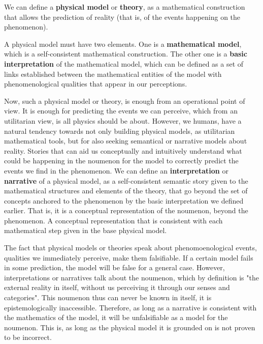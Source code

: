 \documentclass[11pt, a4paper]{article} %
\begin{document}
We can define a {\bf physical model} or {\bf theory}, as a mathematical construction that allows the prediction of reality (that is, of the events happening on the phenomenon).

A physical model must have two elements. One is a {\bf mathematical model}, which is a self-consistent mathematical construction. The other one is a {\bf basic interpretation} of the mathematical model, which can be defined as a set of links established between the mathematical entities of the model with phenomenological qualities that appear in our perceptions.

Now, such a physical model or theory, is enough from an operational point of view. It is enough for predicting the events we can perceive, which from an utilitarian view, is all physics should be about. However, we humans, have a natural tendency towards not only building physical models, as utilitarian mathematical tools, but for also seeking semantical or narrative models about reality. Stories that can aid us conceptually and intuitively understand what could be happening in the noumenon for the model to correctly predict the events we find in the phenomenon. We can define an {\bf interpretation} or {\bf narrative} of a physical model, as a self-consistent semantic story given to the mathematical structures and elements of the theory, that go beyond the set of concepts anchored to the phenomenon by the basic interpretation we defined earlier. That is, it is a conceptual representation of the noumenon, beyond the phenomenon. A conceptual representation that is consistent with each mathematical step given in the base physical model. 

The fact that physical models or theories speak about phenomoenological events, qualities we immediately perceive, make them falsifiable. If a certain model fails in some prediction, the model will be false for a general case. However, interpretations or narratives talk about the noumenon, which by definition is "the external reality in itself, without us perceiving it through our senses and categories". This noumenon thus can never be known in itself, it is epistemologically inaccessible. Therefore, as long as a narrative is consistent with the mathematics of the model, it will be unfalsifiable as a model for the noumenon. This is, as long as the physical model it is grounded on is not proven to be incorrect.
\end{document}
